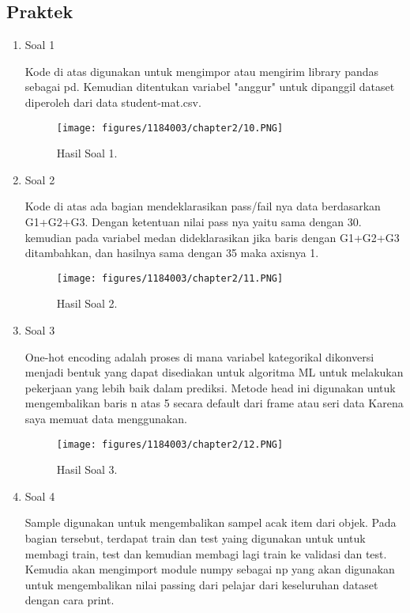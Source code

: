 \subsection{Praktek}
\begin{enumerate}
	\item Soal 1
	\hfill\break
	
	Kode di atas digunakan untuk mengimpor atau mengirim library pandas sebagai pd. Kemudian ditentukan variabel "anggur" untuk dipanggil dataset diperoleh dari data student-mat.csv. 
	\begin{figure}[h]
	\centering
		\texttt{[image: figures/1184003/chapter2/10.PNG]}
		\caption{Hasil Soal 1.}
	\end{figure}
	\item Soal 2
	\hfill\break
	
	Kode di atas ada bagian mendeklarasikan pass/fail nya data berdasarkan G1+G2+G3. Dengan ketentuan nilai pass nya yaitu sama dengan 30. kemudian pada variabel medan dideklarasikan jika baris dengan G1+G2+G3 ditambahkan, dan hasilnya sama dengan 35 maka axisnya 1.
	\begin{figure}[h]
	\centering
		\texttt{[image: figures/1184003/chapter2/11.PNG]}
		\caption{Hasil Soal 2.}
	\end{figure}
	\item Soal 3
	\hfill\break
	
	One-hot encoding adalah proses di mana variabel kategorikal dikonversi menjadi bentuk yang dapat disediakan untuk algoritma ML untuk melakukan pekerjaan yang lebih baik dalam prediksi. Metode head ini digunakan untuk mengembalikan baris n atas 5 secara default dari frame atau seri data Karena saya memuat data menggunakan. 
	\begin{figure}[h]
	\centering
		\texttt{[image: figures/1184003/chapter2/12.PNG]}
		\caption{Hasil Soal 3.}
	\end{figure}
	\item Soal 4
	\hfill\break
	
	Sample digunakan untuk mengembalikan sampel acak item dari objek. Pada bagian tersebut, terdapat train dan test yaing digunakan untuk untuk membagi train, test dan kemudian membagi lagi train ke validasi dan test. Kemudia akan mengimport module numpy sebagai np yang akan digunakan untuk mengembalikan nilai passing dari pelajar dari keseluruhan dataset dengan cara print.

\end{enumerate}
